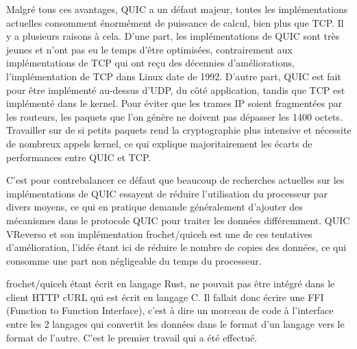 Malgré tous ces avantages, QUIC a un défaut majeur, toutes les implémentations actuelles consomment énormément de puissance de calcul, bien plus que TCP.
Il y a plusieurs raisons à cela. D'une part, les implémentations de QUIC sont très jeunes et n'ont pas eu le temps d'être optimisées, contrairement aux implémentations de TCP qui ont reçu des décennies d'améliorations, l'implémentation de TCP dans Linux date de 1992.
D'autre part, QUIC est fait pour être implémenté au-dessus d'UDP, du côté application, tandis que TCP est implémenté dans le kernel. Pour éviter que les trames IP soient fragmentées par les routeurs, les paquets que l'on génère ne doivent pas dépasser les 1400 octets. Travailler sur de si petits paquets rend la cryptographie plus intensive et nécessite de nombreux appels kernel, ce qui explique majoritairement les écarts de performances entre QUIC et TCP.

C'est pour contrebalancer ce défaut que beaucoup de recherches actuelles sur les implémentations de QUIC essayent de réduire l'utilisation du processeur par divers moyens, ce qui en pratique demande généralement d'ajouter des mécanismes dans le protocole QUIC pour traiter les données différemment.
QUIC VReverso et son implémentation frochet/quiceh est une de ces tentatives d'amélioration, l'idée étant ici de réduire le nombre de copies des données, ce qui consomme une part non négligeable du temps du processeur.

frochet/quiceh étant écrit en langage Rust, ne pouvait pas être intégré dans le client HTTP cURL qui est écrit en langage C. Il fallait donc écrire une FFI (Function to Function Interface), c'est à dire un morceau de code à l'interface entre les 2 langages qui convertit les données dans le format d'un langage vers le format de l'autre.
C'est le premier travail qui a été effectué.